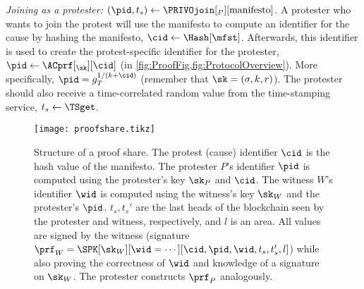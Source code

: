 \emph{Joining as a protester: \((\pid, t_s)\gets 
    \PRIVOjoin[_P][\text{manifesto}]\).}
A protester who wants to join the protest will use the manifesto to compute an identifier for the cause by hashing the manifesto, \(\cid\gets \Hash[\mfst]\).
Afterwards, this identifier is used to create the protest-specific identifier for the protester, \(\pid\gets \ACprf[_{\sk}][\cid]\) (in 
\cref{fig:ProofFig,fig:ProtocolOverview}).
More specifically, \(\pid = g_T^{1/(k+\cid)}\) (remember that \(\sk = (\sigma, k, r)\)).
The protester should also receive a time-correlated random value from the time-stamping service, \(t_s\gets \TSget\).


\begin{figure}
  \centering
  \texttt{[image: proofshare.tikz]}
  \caption{%
    Structure of a proof share.
    The protest (cause) identifier \(\cid\) is the hash value of the manifesto.
    The protester \(P\)'s identifier \(\pid\) is computed using the protester's key \(\sk_P\) and \(\cid\).
    The witness \(W\)'s identifier \(\wid\) is computed using the
    witness's key \(\sk_W\) and the protester's \(\pid\).
    \(t_s, t_s'\) are the last heads of the blockchain seen by the protester and witness, respectively, and \(l\) is an area.
    All values are signed by the witness (signature \(\prf_W = \SPK[\sk_W][\wid 
      = \dotsb][\cid, \pid, \wid, t_s, t_s', l]\)) while also proving the 
    correctness of \(\wid\) and knowledge of a signature on \(\sk_W\).
    The protester constructs \(\prf_P\) analogously.
  }%
  \label{fig:ProofFig}
\end{figure}%

